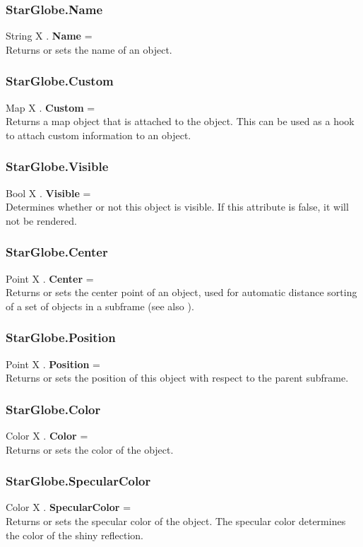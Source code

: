 \subsubsection{StarGlobe.Name \label{F:StarGlobe:Name}}
String X . \textbf{Name} = \\
Returns or sets the name of an object.

\subsubsection{StarGlobe.Custom \label{F:StarGlobe:Custom}}
Map X . \textbf{Custom} = \\
Returns a map object that is attached to the object. This can be used as a hook to attach custom information to an object.


\subsubsection{StarGlobe.Visible \label{F:StarGlobe:Visible}}
Bool X . \textbf{Visible} = \\
Determines whether or not this object is visible. If this attribute is false, it will not be rendered.

\subsubsection{StarGlobe.Center \label{F:StarGlobe:Center}}
Point X . \textbf{Center} = \\
Returns or sets the center point of an object, used for automatic distance sorting of a set of objects in a subframe (see also ).

\subsubsection{StarGlobe.Position \label{F:StarGlobe:Position}}
Point X . \textbf{Position} = \\
Returns or sets the position of this object with respect to the parent subframe.

\subsubsection{StarGlobe.Color \label{F:StarGlobe:Color}}
Color X . \textbf{Color} = \\
Returns or sets the color of the object.

\subsubsection{StarGlobe.SpecularColor \label{F:StarGlobe:SpecularColor}}
Color X . \textbf{SpecularColor} = \\
Returns or sets the specular color of the object. The specular color determines the color of the shiny reflection.

